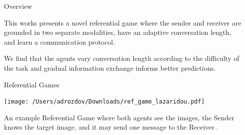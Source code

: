 \documentclass[final]{beamer}
\newlength{\sepwid}
\newlength{\onecolwid}
\begin{document}
\begin{frame}[t] %

\begin{columns}[t] %

\begin{column}{\sepwid}\end{column} %

\begin{column}{\onecolwid} %


\begin{block}{Overview}

This works presents a novel referential game where the sender and receiver are grounded in two separate modalities, have an adaptive conversation length, and learn a communication protocol.

\vspace{5mm}

We find that the agents vary conversation length according to the difficulty of the task and gradual information exchange informs better predictions.

\end{block}

\vspace{5mm}

\begin{block}{Referential Games}

\vspace{-15mm}

\begin{center}
\texttt{[image: /Users/adrozdov/Downloads/ref\_game\_lazaridou.pdf]}
\end{center}

\vspace{5mm}

An example Referential Game where both agents see the images, the Sender knows the target image, and it may send one message to the Receiver \cite{Lazaridou:2017multi}.

\vspace{5mm}


\end{block}
\end{column}
\end{columns}
\end{frame}
\end{document}
